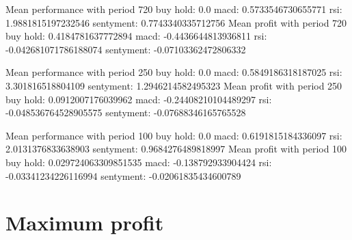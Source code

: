 \documentclass[a4paper,12pt]{report}
\begin{document}
\begin{fig}
Mean performance with period 720
buy hold: 0.0
macd: 0.5733546730655771
rsi: 1.9881815197232546
sentyment: 0.7743340335712756
Mean profit with period 720
buy hold: 0.4184781637772894
macd: -0.4436644813936811
rsi: -0.042681071786188074
sentyment: -0.07103362472806332


Mean performance with period 250
buy hold: 0.0
macd: 0.5849186318187025
rsi: 3.301816518804109
sentyment: 1.2946214582495323
Mean profit with period 250
buy hold: 0.0912007176039962
macd: -0.24408210104489297
rsi: -0.048536764528905575
sentyment: -0.07688346165765528

Mean performance with period 100
buy hold: 0.0
macd: 0.6191815184336097
rsi: 2.0131376833638903
sentyment: 0.9684276489818997
Mean profit with period 100
buy hold: 0.029724063309851535
macd: -0.138792933904424
rsi: -0.03341234226116994
sentyment: -0.02061835434600789

\section{Maximum profit}


\newpage

\end{fig}
\end{document}
